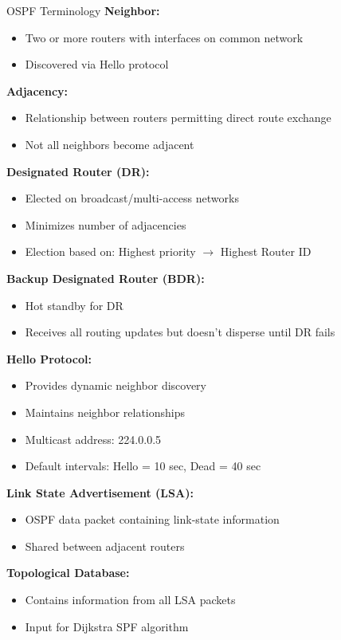 \documentclass[12pt,a4paper]{article}
\begin{document}
\begin{theorybox}{OSPF Terminology}
\textbf{Neighbor:}
\begin{itemize}[noitemsep]
    \item Two or more routers with interfaces on common network
    \item Discovered via Hello protocol
\end{itemize}

\vspace{0.2cm}
\textbf{Adjacency:}
\begin{itemize}[noitemsep]
    \item Relationship between routers permitting direct route exchange
    \item Not all neighbors become adjacent
\end{itemize}

\vspace{0.2cm}
\textbf{Designated Router (DR):}
\begin{itemize}[noitemsep]
    \item Elected on broadcast/multi-access networks
    \item Minimizes number of adjacencies
    \item Election based on: Highest priority $\rightarrow$ Highest Router ID
\end{itemize}

\vspace{0.2cm}
\textbf{Backup Designated Router (BDR):}
\begin{itemize}[noitemsep]
    \item Hot standby for DR
    \item Receives all routing updates but doesn't disperse until DR fails
\end{itemize}

\vspace{0.2cm}
\textbf{Hello Protocol:}
\begin{itemize}[noitemsep]
    \item Provides dynamic neighbor discovery
    \item Maintains neighbor relationships
    \item Multicast address: 224.0.0.5
    \item Default intervals: Hello = 10 sec, Dead = 40 sec
\end{itemize}

\vspace{0.2cm}
\textbf{Link State Advertisement (LSA):}
\begin{itemize}[noitemsep]
    \item OSPF data packet containing link-state information
    \item Shared between adjacent routers
\end{itemize}

\vspace{0.2cm}
\textbf{Topological Database:}
\begin{itemize}[noitemsep]
    \item Contains information from all LSA packets
    \item Input for Dijkstra SPF algorithm
\end{itemize}
\end{theorybox}
\end{document}
